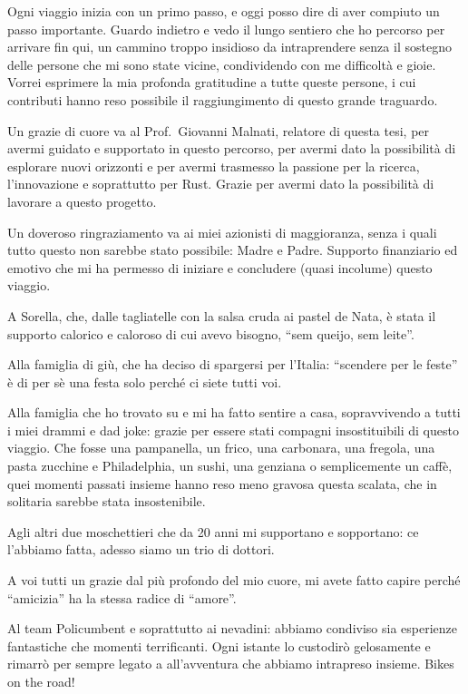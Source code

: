 

Ogni viaggio inizia con un primo passo, e oggi posso dire di aver compiuto un passo importante. Guardo indietro e vedo il lungo sentiero che ho percorso per arrivare fin qui, un cammino troppo insidioso da intraprendere senza il sostegno delle persone che mi sono state vicine, condividendo con me difficoltà e gioie. Vorrei esprimere la mia profonda gratitudine a tutte queste persone, i cui contributi hanno reso possibile il raggiungimento di questo grande traguardo.

Un grazie di cuore va al Prof.~Giovanni Malnati, relatore di questa tesi, per avermi guidato e supportato in questo percorso, per avermi dato la possibilità di esplorare nuovi orizzonti e per avermi trasmesso la passione per la ricerca, l'innovazione e soprattutto per Rust. Grazie per avermi dato la possibilità di lavorare a questo progetto.

Un doveroso ringraziamento va ai miei azionisti di maggioranza, senza i quali tutto questo non sarebbe stato possibile: Madre e Padre. Supporto finanziario ed emotivo che mi ha permesso di iniziare e concludere (quasi incolume) questo viaggio.

A Sorella, che, dalle tagliatelle con la salsa cruda ai pastel de Nata, è stata il supporto calorico e caloroso di cui avevo bisogno, ``sem queijo, sem leite''.

Alla famiglia di giù, che ha deciso di spargersi per l'Italia: ``scendere per le feste'' è di per sè una festa solo perché ci siete tutti voi.

Alla famiglia che ho trovato su e mi ha fatto sentire a casa, sopravvivendo a tutti i miei drammi e dad joke: grazie per essere stati compagni insostituibili di questo viaggio. Che fosse una pampanella, un frico, una carbonara, una fregola, una pasta zucchine e Philadelphia, un sushi, una genziana o semplicemente un caffè, quei momenti passati insieme hanno reso meno gravosa questa scalata, che in solitaria sarebbe stata insostenibile.

Agli altri due moschettieri che da 20 anni mi supportano e sopportano: ce l'abbiamo fatta, adesso siamo un trio di dottori.

A voi tutti un grazie dal più profondo del mio cuore, mi avete fatto capire perché ``amicizia'' ha la stessa radice di ``amore''.

Al team Policumbent e soprattutto ai nevadini: abbiamo condiviso sia esperienze fantastiche che momenti terrificanti. Ogni istante lo custodirò gelosamente e rimarrò per sempre legato a all'avventura che abbiamo intrapreso insieme. Bikes on the road!

